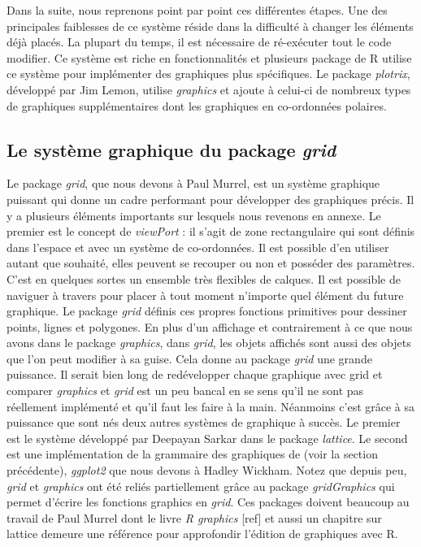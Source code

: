 \documentclass[]{article}
\begin{document}
Dans la suite, nous reprenons point par point ces différentes étapes. Une des
principales faiblesses de ce système réside dans la difficulté à changer les
éléments déjà placés. La plupart du temps, il est nécessaire de ré-exécuter tout
le code modifier. Ce système est riche en fonctionnalités et plusieurs package
de R utilise ce système pour implémenter des graphiques plus spécifiques. Le
package \emph{plotrix}, développé par Jim Lemon, utilise \emph{graphics} et ajoute à
celui-ci de nombreux types de graphiques supplémentaires dont les graphiques en
co-ordonnées polaires.

\hypertarget{le-systuxe8me-graphique-du-package-grid}{%
\subsection{\texorpdfstring{Le système graphique du package \emph{grid}}{Le système graphique du package grid}}\label{le-systuxe8me-graphique-du-package-grid}}

Le package \emph{grid}, que nous devons à Paul Murrel, est un système graphique puissant qui donne un cadre performant pour développer des graphiques précis. Il y a plusieurs éléments importants sur lesquels nous revenons en annexe. Le premier est le concept de \emph{viewPort} : il s'agit de zone rectangulaire qui sont définis dans l'espace et avec un système de co-ordonnées. Il est possible d'en utiliser autant que souhaité, elles peuvent se recouper ou non et posséder des paramètres. C'est en quelques sortes un ensemble très flexibles de calques. Il est possible de naviguer à travers pour placer à tout moment n'importe quel élément du future graphique. Le package \emph{grid} définis ces propres fonctions primitives pour dessiner points, lignes et polygones. En plus d'un affichage et contrairement à ce que nous avons dans le package \emph{graphics}, dans \emph{grid}, les objets affichés sont aussi des objets que l'on peut modifier à sa guise. Cela donne au package \emph{grid} une grande puissance. Il serait bien long de redévelopper chaque graphique avec grid et comparer \emph{graphics} et \emph{grid} est un peu bancal en se sens qu'il ne sont pas réellement implémenté et qu'il faut les faire à la main. Néanmoins c'est grâce à sa puissance que sont nés deux autres systèmes de graphique à succès. Le premier est le système développé par Deepayan Sarkar dans le package \emph{lattice}. Le second est une implémentation de la grammaire des graphiques de (voir la section précédente), \emph{ggplot2} que nous devons à Hadley Wickham. Notez que depuis peu, \emph{grid} et \emph{graphics} ont été reliés partiellement grâce au package \emph{gridGraphics} qui permet d'écrire les fonctions graphics en \emph{grid}.
Ces packages doivent beaucoup au travail de Paul Murrel dont le livre \emph{R graphics} {[}ref{]} et aussi un chapitre sur lattice demeure une référence pour approfondir l'édition de graphiques avec R.
\end{document}
